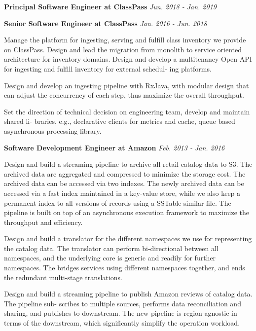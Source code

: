 \documentclass[letterpaper, 10pt]{article}
\renewenvironment{itemize}{
  \begin{list}{}{
    \setlength{\leftmargin}{1.5em}
  }
}{
  \end{list}
}
\begin{document}
\begin{itemize}
	\item \textbf{Principal Software Engineer at ClassPass}
	\hspace{2.4in} \textit{Jun. 2018 - Jan. 2019}
	\item \textbf{Senior Software Engineer at ClassPass}
	\hspace{2.5in} \textit{Jan. 2016 - Jun. 2018}

	\begin{itemize}
		\item{Manage the platform for ingesting, serving and fulfill class inventory we provide on ClassPass.
			Design and lead the migration from monolith to service oriented architecture for inventory domains.
			Design and develop a multitenancy Open API for ingesting and fulfill inventory for external schedul-
			ing platforms.}
		\item{
			Design and develop an ingesting pipeline with RxJava, with modular design that can adjust the
			concurrency of each step, thus maximize the overall throughput.}
		\item{
			Set the direction of technical decision on engineering team, develop and maintain shared li-
			braries, e.g., declarative clients for metrics and cache, queue based asynchronous processing library.}
	\end{itemize}
\end{itemize}

\begin{itemize}
	\item \textbf{Software Development Engineer at Amazon}
	\hspace{2.4in} \textit{Feb. 2013 - Jan. 2016}
	
	\begin{itemize}
		\item{Design and build a streaming pipeline to archive all retail catalog data to S3. The archived data are
			aggregated and compressed to minimize the storage cost. The archived data can be accessed via two
			indexes. The newly archived data can be accessed via a fast index maintained in a key-value store, while
			we also keep a permanent index to all versions of records using a SSTable-similar file. The pipeline is
			built on top of an asynchronous execution framework to maximize the throughput and efficiency.}
		\item{
			Design and build a translator for the different namespaces we use for representing the catalog data. The
			translator can perform bi-directional between all namespaces, and the underlying core is generic and
			readily for further namespaces. The bridges services using different namespaces together, and ends the
			redundant multi-stage translations.}
		\item{
			Design and build a streaming pipeline to publish Amazon reviews of catalog data. The pipeline sub-
			scribes to multiple sources, performs data reconciliation and sharing, and publishes to downstream. The
			new pipeline is region-agnostic in terms of the downstream, which significantly simplify the operation
			workload.}
	\end{itemize}
\end{itemize}
\end{document}
